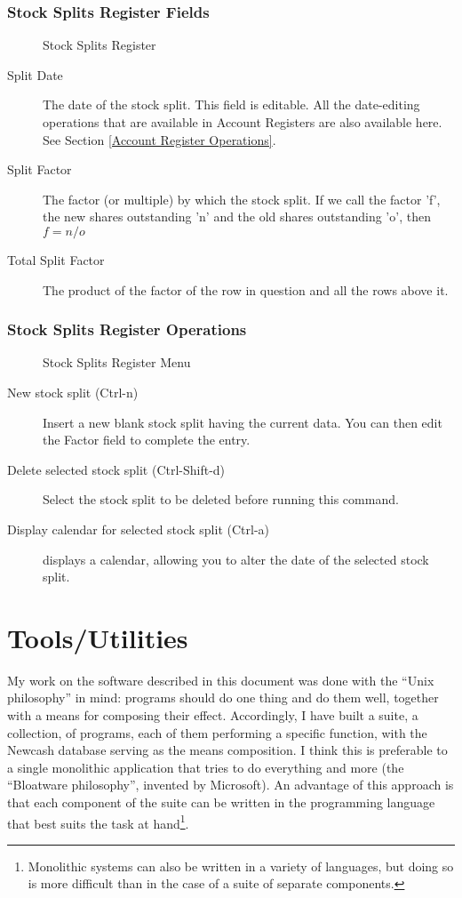 \documentclass{report}
\newcommand{\graphicsfig}[5]{
\begin{figure}[#5]
\begin{center}
\resizebox{#1}{!}{\texttt{[image: \#2]}}
\end{center}
\caption{#3}
\label{#4}
\end{figure}
}
\begin{document}
\subsubsection{Stock Splits Register Fields}
\graphicsfig{5in}{figures/stock_splits_register.png}{Stock Splits Register}{Stock Splits Register}{}
\begin{description}
\item[Split Date] The date of the stock split. This field is editable. All the date-editing operations that are available in Account Registers are also available here. See Section \ref{Account Register Operations}.
\item[Split Factor] The factor (or multiple) by which the stock split. If we call the factor 'f', the new shares outstanding 'n' and the old shares outstanding 'o', then $f = n / o$
\item[Total Split Factor] The product of the factor of the row in question and all the rows above it.
\end{description}

\subsubsection{Stock Splits Register Operations}
\label{Stock Splits Register Operations}
\graphicsfig{5in}{figures/stock_splits_register_menu.png}{Stock Splits Register Menu}{Stock Splits Register Menu}{}
\begin{description}
\item[New stock split (Ctrl-n)] Insert a new blank stock split having the current data. You can then edit the Factor field to complete the entry.
\item[Delete selected stock split (Ctrl-Shift-d)] Select the stock split to be deleted before running this command.
\item [Display calendar for selected stock split (Ctrl-a)] displays a calendar, allowing you to alter the date of the selected stock split. 
\end{description}

\section{Tools/Utilities}
\label{Tools/Utilities}
My work on the software described in this document was done with the ``Unix philosophy'' in mind: programs should do one thing and do them well, together with a means for composing their effect. Accordingly, I have built a suite, a collection, of programs, each of them performing a specific function, with the Newcash database serving as the means composition. I think this is preferable to a single monolithic application that tries to do everything  and more (the ``Bloatware philosophy'', invented by Microsoft). An advantage of this approach is that each component of the suite can be written in the programming language that best suits the task at hand\footnote{Monolithic systems can also be written in a variety of languages, but doing so is more difficult than in the case of a suite of separate components.}.
\end{document}
